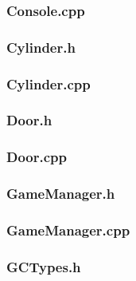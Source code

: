 \documentclass{article}
\begin{document}
\subsubsection{Console.cpp}
	
					
\subsubsection{Cylinder.h}
	
					
\subsubsection{Cylinder.cpp}
	
					
\subsubsection{Door.h}
	

\subsubsection{Door.cpp}
	
 				
\subsubsection{GameManager.h}
	

\subsubsection{GameManager.cpp}
	
	 				
\subsubsection{GCTypes.h}
	
	 				
\end{document}
